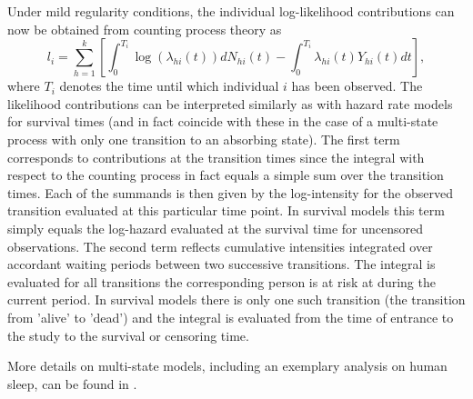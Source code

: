 \documentclass[11pt,a4paper,twoside]{bayesxarticle}
\begin{document}
Under mild regularity conditions, the individual log-likelihood
contributions can now be obtained from counting process theory as
\begin{equation}\label{loglike1}
 l_i = \sum_{h=1}^k\left[ \int_0^{T_i}\log(\lambda_{hi}(t))dN_{hi}(t) -
 \int_0^{T_i}\lambda_{hi}(t)Y_{hi}(t)dt\right],
\end{equation}
where $T_i$ denotes the time until which individual $i$ has been
observed. The likelihood contributions can be interpreted similarly
as with hazard rate models for survival times (and in fact coincide
with these in the case of a multi-state process with only one
transition to an absorbing state). The first term corresponds to
contributions at the transition times since the integral with
respect to the counting process in fact equals a simple sum over the
transition times. Each of the summands is then given by the
log-intensity for the observed transition evaluated at this
particular time point. In survival models this term simply equals
the log-hazard evaluated at the survival time for uncensored
observations. The second term reflects cumulative intensities
integrated over accordant waiting periods between two successive
transitions. The integral is evaluated for all transitions the
corresponding person is at risk at during the current period. In
survival models there is only one such transition (the transition
from 'alive' to 'dead') and the integral is evaluated from the time
of entrance to the study to the survival or censoring time.

More details on multi-state models, including an exemplary analysis on human sleep, can be found in .

\end{document}
